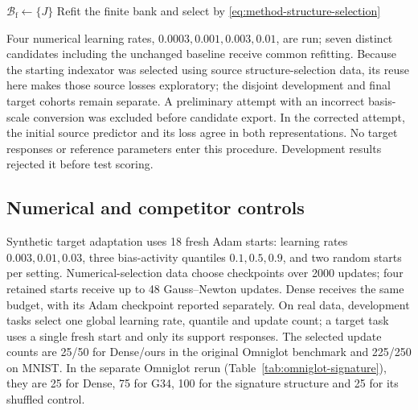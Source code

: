 \begin{algorithm}[htbp]
    \small\DontPrintSemicolon\SetAlgoNoEnd
    $\mathcal B_{\mathrm f}\leftarrow\{J\}$\;
    Refit the finite bank and select by
        \eqref{eq:method-structure-selection}\;
    \caption{Conditional functional proposal refinement}
\end{algorithm}

Four numerical learning rates, $0.0003,0.001,0.003,0.01$, are run;
seven distinct candidates including the unchanged baseline receive
common refitting. Because the starting indexator was selected using
source structure-selection data, its reuse here makes those source
losses exploratory; the disjoint development and final target cohorts
remain separate. A preliminary attempt with an incorrect basis-scale
conversion was excluded before candidate export. In the corrected
attempt, the initial source predictor and its loss agree in both
representations. No target responses or reference parameters enter
this procedure. Development results rejected it before test scoring.

\subsection{Numerical and competitor controls}

Synthetic target adaptation uses 18 fresh Adam starts: learning rates
$0.003,0.01,0.03$, three bias-activity quantiles $0.1,0.5,0.9$, and two
random starts per setting. Numerical-selection data choose checkpoints
over 2000 updates; four retained starts receive up to 48 Gauss--Newton
updates. Dense receives the same budget, with its Adam checkpoint
reported separately. On real data, development tasks select one global
learning rate, quantile and update count; a target task uses a single
fresh start and only its support responses. The selected update counts
are 25/50 for Dense/ours in the original Omniglot benchmark and
225/250 on MNIST. In the separate Omniglot rerun
(Table~\ref{tab:omniglot-signature}), they are 25 for Dense, 75 for
G34, 100 for the signature structure and 25 for its shuffled control.

